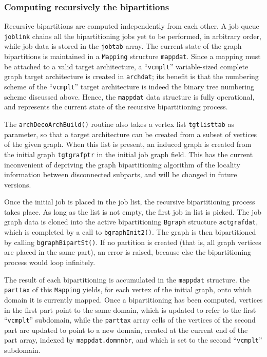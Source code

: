 \subsubsection{Computing recursively the bipartitions}

Recursive bipartitions are computed independently from each other. A
job queue \texttt{joblink} chains all the bipartitioning jobs yet to
be performed, in arbitrary order, while job data is stored in the
\texttt{jobtab} array. The current state of the graph bipartitions is
maintained in a \texttt{Mapping} structure \texttt{mappdat}. Since
a mapping must be attached to a valid target architecture, a
``\texttt{vcmplt}'' variable-sized complete graph target architecture
is created in \texttt{archdat}; its benefit is that the numbering
scheme of the ``\texttt{vcmplt}'' target architecture is indeed the
binary tree numbering scheme discussed above. Hence, the
\texttt{mappdat} data structure is fully operational, and represents
the current state of the recursive bipartitioning process.

The \texttt{archDecoArchBuild()} routine also takes a vertex list
\texttt{tgtlisttab} as parameter, so that a target architecture can be
created from a subset of vertices of the given graph. When this list
is present, an induced graph is created from the initial graph
\texttt{tgtgrafptr} in the initial job graph field. This has the
current inconvenient of depriving the graph bipartitioning algorithm
of the locality information between disconnected subparts, and will be
changed in future versions.

Once the initial job is placed in the job list, the recursive
bipartitioning process takes place. As long as the list is not empty,
the first job in list is picked. The job graph data is cloned into the
active bipartitioning \texttt{Bgraph} structure \texttt{actgrafdat},
which is completed by a call to \texttt{bgraph\lbt Init2()}. The graph
is then bipartitioned by calling \texttt{bgraph\lbt Bipart\lbt St()}.
If no partition is created (that is, all graph vertices are placed in
the same part), an error is raised, because else the bipartitioning
process would loop infinitely.

The result of each bipartitioning is accumulated in the
\texttt{mappdat} structure. the \texttt{parttax} of this
\texttt{Mapping} yields, for each vertex of the initial graph, onto
which domain it is currently mapped. Once a bipartitioning has been
computed, vertices in the first part point to the same domain, which
is updated to refer to the first ``\texttt{vcmplt}'' subdomain, while
the \texttt{parttax} array cells of the vertices of the second part
are updated to point to a new domain, created at the current end of
the part array, indexed by \texttt{mappdat.\lbt domnnbr}, and which is
set to the second ``\texttt{vcmplt}'' subdomain.

